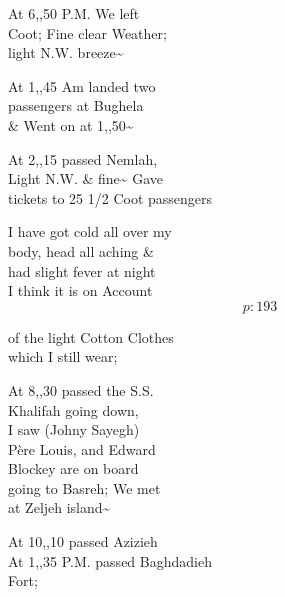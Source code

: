\documentclass{report}
\begin{document}
	\par{
 	At 6,,50 P.M. We left\ \\Coot; Fine clear Weather;\ \\light N.W. breeze\~{}\ \\
	}

	\par{
 	At 1,,45 Am landed two\ \\passengers at Bughela\ \\\& Went on at 1,,50\~{}\ \\
	}

	\par{
 	At 2,,15 passed Nemlah,\ \\Light N.W. \& fine\~{} Gave\ \\tickets to 25 1/2 Coot passengers\ \\
	}

	\par{
 	I have got cold all over my\ \\body, head all aching \&\ \\had slight fever at night\ \\I think it is on Account\ \\
  \[p: 193 \]

	}


	\par{
 	of the light Cotton Clothes\ \\which I still wear;\ \\
	}

	\par{
 	At 8,,30 passed the S.S.\ \\Khalifah going down,\ \\I saw (Johny Sayegh)\ \\Père Louis, and Edward\ \\Blockey are on board\ \\going to Basreh; We met\ \\at Zeljeh island\~{}\ \\
	}

	\par{
 	At 10,,10 passed Azizieh\ \\At 1,,35 P.M. passed Baghdadieh\ \\Fort;\ \\
	}
\end{document}
